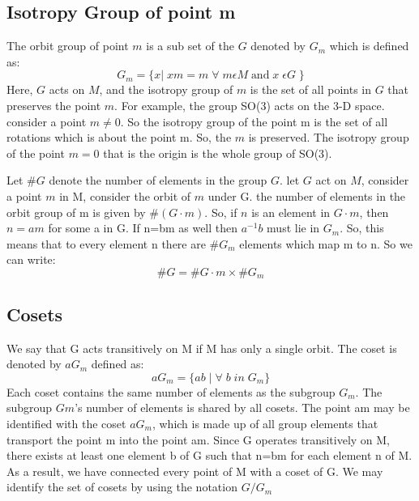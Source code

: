 \subsection{Isotropy Group of point m}
The orbit group of point $m$ is a sub set of the $G$ denoted by $G_m$ which is defined as:
\begin{equation}
    G_m = \{ x | \; xm=m \; \forall \; m  \epsilon M\; \text{and} \; x\; \epsilon G \;\}
\end{equation}
Here, $G$ acts on $M$, and the isotropy group of $m$ is the set of all points in $G$ that preserves the point $m$. For example, the group SO(3) acts on the 3-D space. consider a point $ m\neq 0$. So the isotropy group of the point m is the set of all rotations which is about the point m. So, the $m$ is preserved. The isotropy group of the point $m=0$ that is the origin is the whole group of SO(3).

Let $\#G$ denote the number of elements in the group $G$. let $G$ act on $M$, consider a point $m$ in M, consider the orbit of $m$ under G. the number of elements in the orbit group of m is given by $ \# ( G\cdot m ) $. So, if $n$ is an element in $G\cdot m$, then $n=am$ for some a in G. If n=bm as well then $a^{-1}b$ must lie in $G_m$. So, this means that to every element n there are $\#G_m$ elements which map m to n.
So we can write:
\begin{equation}
    \#G = \# G \cdot m \times \# G_m
\end{equation}

\subsection{Cosets}

We say that G acts transitively on M if M has only a single orbit. The coset is denoted by $aG_{m}$  defined as:
\begin{equation}
   aG_m= \{ab \; | \; \forall \;b\; in\; G_m\}    
\end{equation}
Each coset contains the same number of elements as the subgroup $G_m$. The subgroup $Gm$'s number of elements is shared by all cosets. The point am may be identified with the coset $aG_m$, which is made up of all group elements that transport the point m into the point am. Since G operates transitively on M, there exists at least one element b of G such that n=bm for each element n of M. As a result, we have connected every point of M with a coset of G. We may identify the set of cosets by using the notation $G/G_m$ ~\cite{sternberg1995group}


